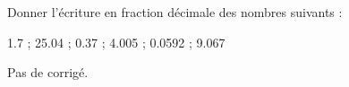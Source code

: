 \begin{exercice*}
    Donner l'écriture en fraction décimale des nombres suivants :
    \begin{center}
       \num{1.7} \; ; \; \num{25.04} \; ; \; \num{0.37} \; ; \; \num{4.005} \; ; \; \num{0.0592} \; ; \; \num{9.067}
    \end{center}
 \end{exercice*}
\begin{corrige}
  Pas de corrigé.
\end{corrige}

